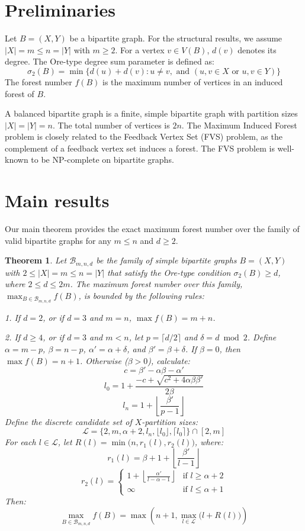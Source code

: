 \documentclass[a4paper]{amsart}
\newtheorem{theorem}{Theorem}[section]
\begin{document}
\section{Preliminaries}

Let $B = (X, Y)$ be a bipartite graph. For the structural results, we assume $|X| = m \le n = |Y|$ with $m \ge 2$.
For a vertex $v \in V(B)$, $d(v)$ denotes its degree.
The Ore-type degree sum parameter is defined as:
\[ \sigma_2(B) = \min \{d(u)+d(v) : u \ne v, \text{ and } (u,v \in X \text{ or } u,v \in Y)\} \]
The forest number $f(B)$ is the maximum number of vertices in an induced forest of $B$.

A balanced bipartite graph is a finite, simple bipartite graph with partition sizes $|X| = |Y| = n$. The total number of vertices is $2n$.
The Maximum Induced Forest problem is closely related to the Feedback Vertex Set (FVS) problem, as the complement of a feedback vertex set induces a forest. The FVS problem is well-known to be NP-complete on bipartite graphs.

\section{Main results}

Our main theorem provides the exact maximum forest number over the family of valid bipartite graphs for any $m \le n$ and $d \ge 2$.

\begin{theorem} \label{thm:main}
Let $\mathcal{B}_{m,n,d}$ be the family of simple bipartite graphs $B = (X, Y)$ with $2 \le |X| = m \le n = |Y|$ that satisfy the Ore-type condition $\sigma_2(B) \ge d$, where $2 \le d \le 2m$.
The maximum forest number over this family, $\max_{B \in \mathcal{B}_{m,n,d}} f(B)$, is bounded by the following rules:

1. If $d = 2$, or if $d = 3$ and $m = n$, $\max f(B) = m + n$.

2. If $d \ge 4$, or if $d = 3$ and $m < n$, let $p = \lceil d/2 \rceil$ and $\delta = d \bmod 2$. Define $\alpha = m - p$, $\beta = n - p$, $\alpha' = \alpha + \delta$, and $\beta' = \beta + \delta$.
If $\beta = 0$, then $\max f(B) = n + 1$.
Otherwise ($\beta > 0$), calculate:
\[ c = \beta' - \alpha \beta - \alpha' \]
\[ l_0 = 1 + \frac{-c + \sqrt{c^2 + 4 \alpha \beta \beta'}}{2\beta} \]
\[ l_n = 1 + \left\lfloor \frac{\beta'}{p-1} \right\rfloor \]
Define the discrete candidate set of $X$-partition sizes:
\[ \mathcal{L} = \Big\{ 2, m, \alpha+2, l_n, \lfloor l_0 \rfloor, \lceil l_0 \rceil \Big\} \cap [2, m] \]
For each $l \in \mathcal{L}$, let $R(l) = \min \big( n, r_1(l), r_2(l) \big)$, where:
\[ r_1(l) = \beta + 1 + \left\lfloor \frac{\beta'}{l-1} \right\rfloor \]
\[ r_2(l) = \begin{cases} 1 + \left\lfloor \frac{\alpha'}{l - \alpha - 1} \right\rfloor & \text{if } l \ge \alpha + 2 \\ \infty & \text{if } l \le \alpha + 1 \end{cases} \]
Then:
\[ \max_{B \in \mathcal{B}_{m,n,d}} f(B) = \max \left( n+1, \max_{l \in \mathcal{L}} \big(l + R(l)\big) \right) \]
\end{theorem}
\end{document}
